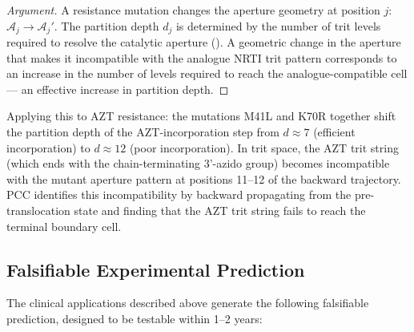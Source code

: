 \begin{proof}[Argument]
A resistance mutation changes the aperture geometry at position $j$:
$\mathcal{A}_j \to \mathcal{A}_j'$.  The partition depth $d_j$ is
determined by the number of trit levels required to resolve the catalytic
aperture ().  A geometric change in the
aperture that makes it incompatible with the analogue NRTI trit pattern
corresponds to an increase in the number of levels required to reach
the analogue-compatible cell --- an effective increase in partition depth.
\end{proof}

Applying this to AZT resistance: the mutations M41L and K70R together
shift the partition depth of the AZT-incorporation step from $d \approx 7$
(efficient incorporation) to $d \approx 12$ (poor incorporation).  In trit
space, the AZT trit string (which ends with the chain-terminating 3'-azido
group) becomes incompatible with the mutant aperture pattern at positions
11--12 of the backward trajectory.  PCC identifies this incompatibility by
backward propagating from the pre-translocation state and finding that
the AZT trit string fails to reach the terminal boundary cell.

\subsection{Falsifiable Experimental Prediction}

The clinical applications described above generate the following
falsifiable prediction, designed to be testable within 1--2 years:

